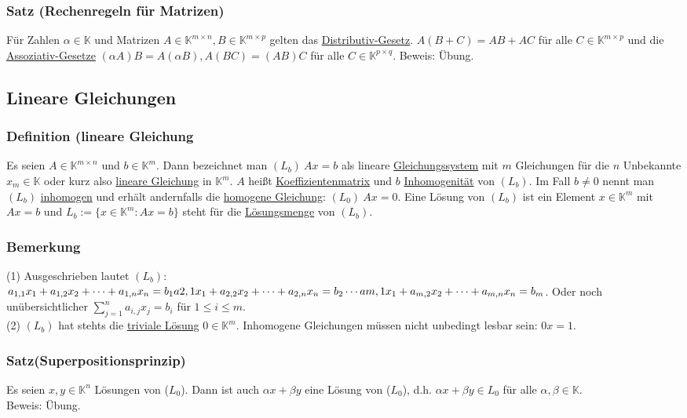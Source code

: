 \subsubsection{Satz (Rechenregeln für Matrizen)}
Für Zahlen $\alpha \in \mathbb{K}$ und Matrizen $A\in \mathbb{K}^{m\times n},B\in\mathbb{K}^{m\times p}$ gelten das \underline{Distributiv-Gesetz}.  $A(B+C)=AB+AC$ für alle $C\in \mathbb{K}^{m\times p}$ und die \underline{Assoziativ-Gesetze} $(\alpha A)B=A(\alpha B), A(BC)=(AB)C$ für alle $C\in \mathbb{K}^{p\times q}$.
Beweis: Übung.
\subsection{Lineare Gleichungen}
\subsubsection{Definition (lineare Gleichung}
Es seien $A\in \mathbb{K}^{m\times n}$ und $b\in \mathbb{K}^{m}$.  Dann bezeichnet man $(L_b)\ Ax=b$ als lineare \underline{Gleichungssystem} mit $m$ Gleichungen für die $n$ Unbekannte $x_m\in \mathbb{K}$ oder kurz also \underline{lineare Gleichung} in $\mathbb{K}^m$.  $A$ heißt \underline{Koeffizientenmatrix} und $b$ \underline{Inhomogenität} von $(L_b)$.  Im Fall $b\not= 0$ nennt man $(L_b)$ \underline{inhomogen} und erhält andernfalls die \underline{homogene Gleichung}: $(L_0)\ Ax=0$.  Eine Lösung von $(L_b)$ ist ein Element $x\in \mathbb{K}^m$ mit $Ax=b$ und $L_b:=\{ x\in \mathbb{K}^m:Ax=b\}$ steht für die \underline{Lösungsmenge} von $(L_b)$.
\subsubsection{Bemerkung}
(1) Ausgeschrieben lautet $(L_b)$: $a_{1,1}x_1+a_{1,2}x_2+\cdots +a_{1,n}x_n = b_1\\a{2,1}x_1+a_{2,2}x_2+\cdots +a_{2,n}x_n = b_2\\\cdots \\a{m,1}x_1+a_{m,2}x_2+\cdots +a_{m,n}x_n=b_m$.  Oder noch unübersichtlicher $\sum^n_{j=1} a_{i,j}x_j = b_i$ für $1\leq i\leq m$.\\
(2) $(L_b)$ hat stehts die \underline{triviale Lösung} $0\in \mathbb{K}^m$.  Inhomogene Gleichungen müssen nicht unbedingt lesbar sein: $0x=1$.\\
\subsubsection{Satz(Superpositionsprinzip)}
Es seien $x,y \in \mathbb{K}^n$ Lösungen von ($L_0$).  Dann ist auch $\alpha x+\beta y$ eine Lösung von ($L_0$), d.h. $\alpha x+\beta y\in L_0$ für alle $\alpha ,\beta \in \mathbb{K}$. \\
Beweis: Übung.
